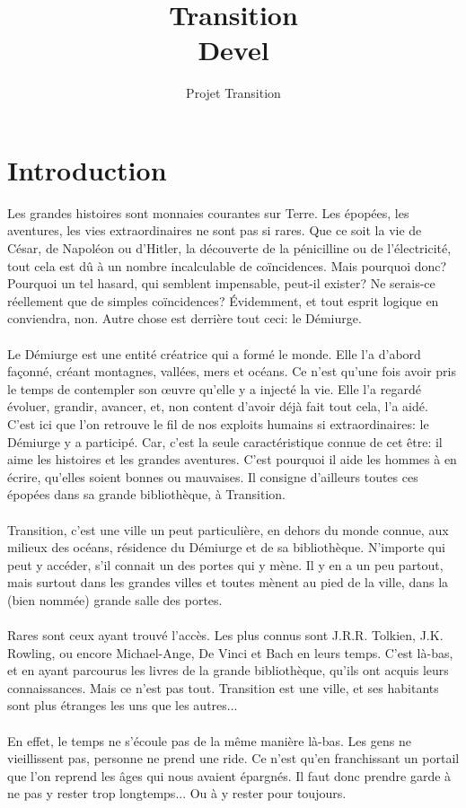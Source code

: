 \documentclass{book}
\title{Transition \\ Devel}
\author{Projet Transition}
\date{\oldstylenums{\insertdate}}
\begin{document}
\maketitle
\setcounter{tocdepth}{2} %
\renewcommand{\contentsname}{Sommaire} 
\tableofcontents

\newpage
\section*{Introduction}
Les grandes histoires sont monnaies courantes sur Terre. Les épopées, les aventures, les vies extraordinaires ne sont pas si rares. Que ce soit la  vie de César, de Napoléon ou d'Hitler, la découverte de la pénicilline ou de l’électricité, tout cela est dû à un nombre incalculable de coïncidences. Mais pourquoi donc? Pourquoi un tel hasard, qui semblent impensable, peut-il exister? Ne serais-ce réellement que de simples coïncidences?
Évidemment, et tout esprit logique en conviendra, non. Autre chose est derrière tout ceci: le Démiurge.
\\
\\
Le Démiurge est une entité créatrice qui a formé le monde. Elle l'a d'abord façonné, créant montagnes, vallées, mers et océans. Ce n'est qu'une fois avoir pris le temps de contempler son œuvre qu'elle y a injecté la vie. Elle l'a regardé évoluer, grandir, avancer, et, non content d'avoir déjà fait tout cela, l'a aidé.
\\
C'est ici que l'on retrouve le fil de nos exploits humains si extraordinaires: le Démiurge y a participé. Car, c'est la seule caractéristique connue de cet être: il aime les histoires et les grandes aventures. C'est pourquoi il aide les hommes à en écrire, qu'elles soient bonnes ou mauvaises.
Il consigne d'ailleurs toutes ces épopées dans sa grande bibliothèque, à Transition.
\\
\\
Transition, c'est une ville un peut particulière, en dehors du monde connue, aux milieux des océans, résidence du Démiurge et de sa bibliothèque. N'importe qui peut y accéder, s'il connait un des portes qui y mène. Il y en a un peu partout, mais surtout dans les grandes villes et toutes mènent au pied de la ville, dans la (bien nommée) grande salle des portes.
\\
\\
Rares sont ceux ayant trouvé l'accès. Les plus connus sont J.R.R. Tolkien, J.K. Rowling, ou encore Michael-Ange, De Vinci et Bach en leurs temps. C'est là-bas, et en ayant parcourus les livres de la grande bibliothèque, qu'ils ont acquis leurs connaissances. Mais ce n'est pas tout. Transition est une ville, et ses habitants sont plus étranges les uns que les autres...
\\
\\
En effet, le temps ne s'écoule pas de la même manière là-bas. Les gens ne vieillissent pas, personne ne prend une ride. Ce n'est qu'en franchissant un portail que l'on reprend les âges qui nous avaient épargnés. Il faut donc prendre garde à ne pas y rester trop longtemps... Ou à y rester pour toujours.
\end{document}
